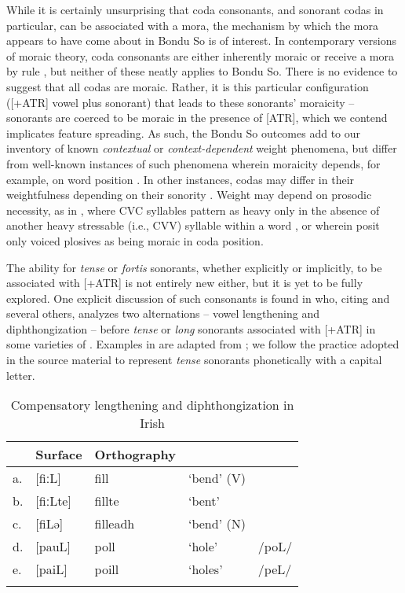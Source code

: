 \documentclass[output=paper,colorlinks,citecolor=brown]{langscibook}
\begin{document}
While it is certainly unsurprising that coda consonants, and sonorant codas in particular, can be associated with a mora, the mechanism by which the mora appears to have come about in Bondu So is of interest. In contemporary versions of moraic theory, coda consonants are either inherently moraic \citep{Hyman1985} or receive a mora by rule \citep{Hayes1995}, but neither of these neatly applies to Bondu So. There is no evidence to suggest that all codas are moraic. Rather, it is this particular configuration ([+ATR] vowel plus sonorant) that leads to these sonorants' moraicity -- sonorants are coerced to be moraic in the presence of [ATR], which we contend implicates feature spreading. As such, the Bondu So outcomes add to our inventory of  known \textit{contextual} or \textit{context-dependent} weight phenomena, but differ from well-known instances of such phenomena wherein moraicity depends, for example, on word position \citep{Hayes1994,Hayes1995,RosenthallVdH1999}. In other instances, codas may differ in their weightfulness depending on their sonority \citep{Zec1995}. Weight may depend on prosodic necessity, as in , where CVC syllables pattern as heavy only in the absence of another heavy stressable (i.e., CVV) syllable within a word \citep{Moren2000}, or  wherein \citet{HantganSagnaDavis} posit only voiced plosives as being moraic in coda position. 

The ability  for \textit{tense} or \textit{fortis} sonorants, whether explicitly or implicitly, to be associated with [+ATR] is not entirely new either, but it is yet to be fully explored. One explicit discussion of such consonants is found in \citet{carnie2002} who, citing \citet{NiChiosain1991} and several others, analyzes two alternations -- vowel lengthening and diphthongization -- before \textit{tense} or \textit{long} sonorants associated with [+ATR] in some varieties of . Examples in  are adapted from \citet{carnie2002}; we follow the practice adopted in the source material to represent \textit{tense} sonorants phonetically with a capital letter.

\begin{table}
\caption{Compensatory lengthening and diphthongization in Irish \citep{carnie2002}}
\label{tab:CLIrish}
 \begin{tabular}{lllll}
  \lsptoprule
  & Surface & Orthography &   &  \\
  \midrule
 a. &[f\/iːL] & fill & `bend' (V) &\\
 b. & [f\/iːLte] & fillte & `bent'& \\
 c. &[f\/iLə] & filleadh &`bend' (N) & \\\addlinespace
 d. & [pauL] & poll& `hole' & /poL/ \\
 e. & [paiL] & poill & `holes' & /peL/ \\
  \lspbottomrule
 \end{tabular}
\end{table}
\end{document}
